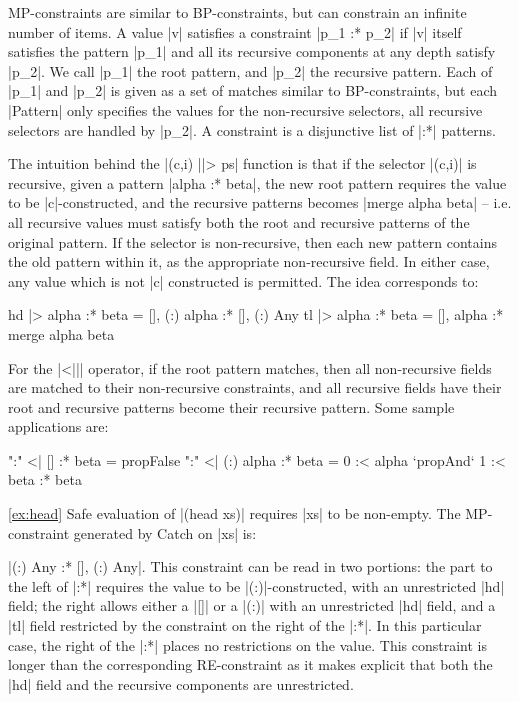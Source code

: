 \documentclass[preprint]{sigplanconf}
\begin{document}
MP-constraints are similar to BP-constraints, but can constrain an infinite number of items. A value |v| satisfies a constraint |p_1 :* p_2| if |v| itself satisfies the pattern |p_1| and all its recursive components at any depth satisfy |p_2|. We call |p_1| the root pattern, and |p_2| the recursive pattern. Each of |p_1| and |p_2| is given as a set of matches similar to BP-constraints, but each |Pattern| only specifies the values for the non-recursive selectors, all recursive selectors are handled by |p_2|. A constraint is a disjunctive list of |:*| patterns.

The intuition behind the |(c,i) ||> ps| function is that if the selector |(c,i)| is recursive, given a pattern |alpha :* beta|, the new root pattern requires the value to be |c|-constructed, and the recursive patterns becomes |merge alpha beta| -- i.e. all recursive values must satisfy both the root and recursive patterns of the original pattern. If the selector is non-recursive, then each new pattern contains the old pattern within it, as the appropriate non-recursive field. In either case, any value which is not |c| constructed is permitted. The idea corresponds to:

\ignore\begin{code}
hd  |> {alpha :* beta} = {[], (:) alpha :* [], (:) Any}
tl  |> {alpha :* beta} = {[], alpha :* merge alpha beta}
\end{code}

For the |<||| operator, if the root pattern matches, then all non-recursive fields are matched to their non-recursive constraints, and all recursive fields have their root and recursive patterns become their recursive pattern. Some sample applications are:

\ignore\begin{code}
":" <| {[]         :* beta} = propFalse
":" <| {(:) alpha  :* beta} = 0 :< alpha `propAnd` 1 :< {beta :* beta}
\end{code}

\begin{examplerevisit}{\ref{ex:head}} Safe evaluation of |(head xs)| requires |xs| to be non-empty. The MP-constraint generated by Catch on |xs| is: \ignore|{(:) Any} :* {[], (:) Any}|. This constraint can be read in two portions: the part to the left of |:*| requires the value to be |(:)|-constructed, with an unrestricted |hd| field; the right allows either a |[]| or a |(:)| with an unrestricted |hd| field, and a |tl| field restricted by the constraint on the right of the |:*|. In this particular case, the right of the |:*| places no restrictions on the value. This constraint is longer than the corresponding RE-constraint as it makes explicit that both the |hd| field and the recursive components are unrestricted.
\end{examplerevisit}
\end{document}
